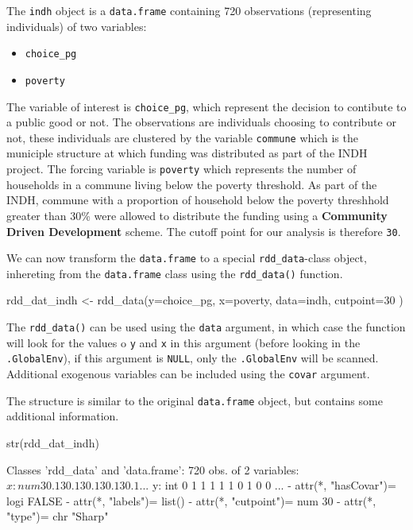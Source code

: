 \documentclass[article]{jss}
\begin{document}
The \texttt{indh} object is a \texttt{data.frame} containing 720
observations (representing individuals) of two variables:

\begin{itemize}
\itemsep1pt\parskip0pt
\item
  \texttt{choice\_pg}
\item
  \texttt{poverty}
\end{itemize}

The variable of interest is \texttt{choice\_pg}, which represent the
decision to contibute to a public good or not. The observations are
individuals choosing to contribute or not, these individuals are
clustered by the variable \texttt{commune} which is the municiple
structure at which funding was distributed as part of the INDH project.
The forcing variable is \texttt{poverty} which represents the number of
households in a commune living below the poverty threshold. As part of
the INDH, commune with a proportion of household below the poverty
threshhold greater than 30\% were allowed to distribute the funding
using a \textbf{Community Driven Development} scheme. The cutoff point
for our analysis is therefore \texttt{30}.

We can now transform the \texttt{data.frame} to a special
\texttt{rdd\_data}-class object, inhereting from the \texttt{data.frame}
class using the \texttt{rdd\_data()} function.

\begin{CodeChunk}
\begin{CodeInput}
rdd_dat_indh <- rdd_data(y=choice_pg,
                         x=poverty,
                         data=indh,
                         cutpoint=30 )
\end{CodeInput}
\end{CodeChunk}

The \texttt{rdd\_data()} can be used using the \texttt{data} argument,
in which case the function will look for the values o \texttt{y} and
\texttt{x} in this argument (before looking in the \texttt{.GlobalEnv}),
if this argument is \texttt{NULL}, only the \texttt{.GlobalEnv} will be
scanned. Additional exogenous variables can be included using the
\texttt{covar} argument.

The structure is similar to the original \texttt{data.frame} object, but
contains some additional information.

\begin{CodeChunk}
\begin{CodeInput}
str(rdd_dat_indh)
\end{CodeInput}
\begin{CodeOutput}
Classes 'rdd_data' and 'data.frame':    720 obs. of  2 variables:
 $ x: num  30.1 30.1 30.1 30.1 30.1 ...
 $ y: int  0 1 1 1 1 1 0 1 0 0 ...
 - attr(*, "hasCovar")= logi FALSE
 - attr(*, "labels")= list()
 - attr(*, "cutpoint")= num 30
 - attr(*, "type")= chr "Sharp"
\end{CodeOutput}
\end{CodeChunk}
\end{document}
